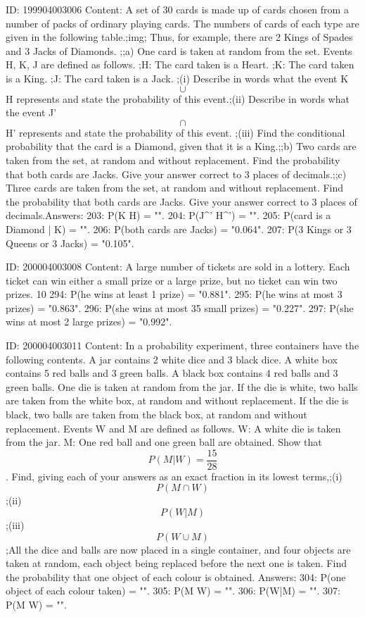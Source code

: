 \documentclass{article}
\begin{document}
ID: 199904003006
Content:
A set of 30 cards is made up of cards chosen from a number of packs of ordinary playing cards. The numbers of cards of each type are given in the following table.;img; Thus, for example, there are 2 Kings of Spades and 3 Jacks of Diamonds.  ;;a) One card is taken at random from the set. Events H, K, J are defined as follows. ;H: The card taken is a Heart. ;K: The card taken is a King. ;J: The card taken is a Jack. ;(i) Describe in words what the event K $$\cup$$ H represents and state the probability of this event.;(ii) Describe in words what the event J' $$\cap$$ H' represents and state the probability of this event. ;(iii) Find the conditional probability that the card is a Diamond, given that it is a King.;;b) Two cards are taken from the set, at random and without replacement. Find the probability that both cards are Jacks. Give your answer correct to 3 places of decimals.;;c) Three cards are taken from the set, at random and without replacement. Find the probability that both cards are Jacks. Give your answer correct to 3 places of decimals.Answers:
203: P(K \cup H) = "".
204: P(J^' \cap H^') = "".
205: P(card is a Diamond | K) = "".
206: P(both cards are Jacks) = "0.064".
207: P(3 Kings or 3 Queens or 3 Jacks) = "0.105".

ID: 200004003008
Content:
A large number of tickets are sold in a lottery. Each ticket can win either a small prize or a large prize, but no ticket can win two prizes. 10%
294: P(he wins at least 1 prize) = "0.881".
295: P(he wins at most 3 prizes) = "0.863".
296: P(she wins at most 35 small prizes) = "0.227".
297: P(she wins at most 2 large prizes) = "0.992".

ID: 200004003011
Content:
In a probability experiment, three containers have the following contents. A jar contains 2 white dice and 3 black dice. A white box contains 5 red balls and 3 green balls. A black box contains 4 red balls and 3 green balls. One die is taken at random from the jar. If the die is white, two balls are taken from the white box, at random and without replacement. If the die is black, two balls are taken from the black box, at random and without   replacement. Events W and M are defined as follows. W: A white die is taken from the jar. M: One red ball and one green ball are obtained. Show that  $$P( M|W ) = \frac{15}{28}$$. Find, giving each of your answers as an exact fraction in its lowest terms,;(i)  $$P( M \cap W )$$;(ii) $$P(W | M)$$;(iii)  $$P( W \cup M )$$;All the dice and balls are now placed in a single container, and four objects are taken at random, each object being replaced before the next one is taken. Find the probability that one object of each colour is obtained. Answers:
304: P(one object of each colour taken) = "".
305: P(M \cap W) = "".
306: P(W|M) = "".
307: P(M \cup W) = "".
\end{document}
